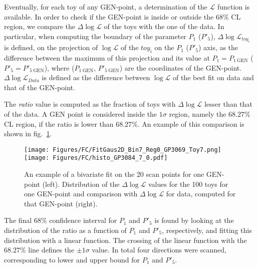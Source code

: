 Eventually, for each toy of any GEN-point, a determination of the $\mathcal{L}$ function is available.
In order to check if the GEN-point is inside or outside the $68\%$ CL region, we compare the $\Delta\log\mathcal{L}$ of the toys with the one of the data.
In particular, when computing the boundary of the parameter $P_1$ ($P'_5$), $\Delta\log\mathcal{L}_{toy_{i}}$ is defined, on the projection of $\log\mathcal{L}$ of the $toy_{i}$ on the $P_1$ ($P'_5$) axis, as the difference between the maximum of this projection and its value at $P_1=P_{1~\mathrm{GEN}}$ ($P'_5=P'_{5~\mathrm{GEN}}$), where ($P_{1~\mathrm{GEN}}$, $P'_{5~\mathrm{GEN}}$) are the coordinates of the GEN-point.
$\Delta\log\mathcal{L}_{Data}$ is defined as the difference between $\log\mathcal{L}$ of the best fit on data and that of the GEN-point.

The {\em ratio} value is computed as the fraction of toys with $\Delta\log\mathcal{L}$ lesser than that of the data.
A GEN point is considered inside the $1\sigma$ region, namely the $68.27\%$ CL region, if the ratio is lower than $68.27\%$.
An example of this comparison is shown in fig.~\ref{fig:ExampleFC}.

\begin{figure}[hbt]
  \centering
  \texttt{[image: Figures/FC/FitGaus2D\_Bin7\_Reg0\_GP3069\_Toy7.png]}
  \texttt{[image: Figures/FC/histo\_GP3084\_7\_0.pdf]}
  \caption{An example of a bivariate fit on the 20 scan points for one GEN-point (left).
    Distribution of the $\Delta\log\mathcal{L}$ values for the 100 toys for one GEN-point and comparison with $\Delta\log\mathcal{L}$ for data, computed for that GEN-point (right).}
  \label{fig:ExampleFC}
\end{figure}

The final $68\%$ confidence interval for $P_1$ and $P'_5$ is found by looking at the distribution of the ratio as a function of $P_1$ and $P'_5$, respectively, and fitting this distribution with a linear function.
The crossing of the linear function with the $68.27\%$ line defines the $\pm1\sigma$ value.
In total four directions were scanned, corresponding to lower and upper bound for $P_1$ and $P'_5$.

